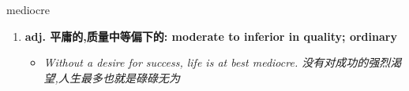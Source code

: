 
\begin{frame}
{\huge mediocre}
\begin{center}
\begin{enumerate}\Large
  \item \textbf{adj. 平庸的,质量中等偏下的: moderate to inferior in quality; ordinary}
  \begin{itemize}
    \item \em{\Large{Without a desire for success, life is at best mediocre. 没有对成功的强烈渴望,人生最多也就是碌碌无为}}
  \end{itemize}
\end{enumerate}
\end{center}
\end{frame}
